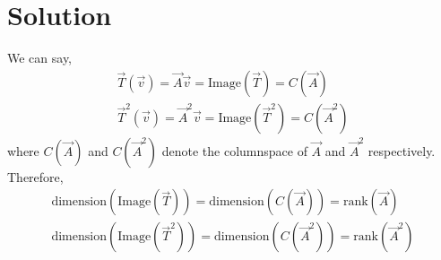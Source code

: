 \documentclass[journal,12pt]{IEEEtran}
\begin{document}
\section{Solution}
We can say,
\begin{align}
    \vec{T}(\vec{v}) = \vec{A}\vec{v} = \text{Image}(\vec{T}) = C(\vec{A})\\
    \vec{T}^2(\vec{v}) = \vec{A}^2\vec{v} = \text{Image}(\vec{T}^2) = C(\vec{A}^2)
\end{align}
where $C(\vec{A})$ and $C(\vec{A}^2)$ denote the columnspace of $\vec{A}$ and $\vec{A}^2$ respectively. Therefore,
\begin{align}
    \text{dimension}(\text{Image}(\vec{T})) = \text{dimension}(C(\vec{A})) = \text{rank}(\vec{A})\\
    \text{dimension}(\text{Image}(\vec{T}^2)) = \text{dimension}(C(\vec{A}^2)) = \text{rank}(\vec{A}^2)
\end{align}
\renewcommand{\thetable}{1}
\end{document}
